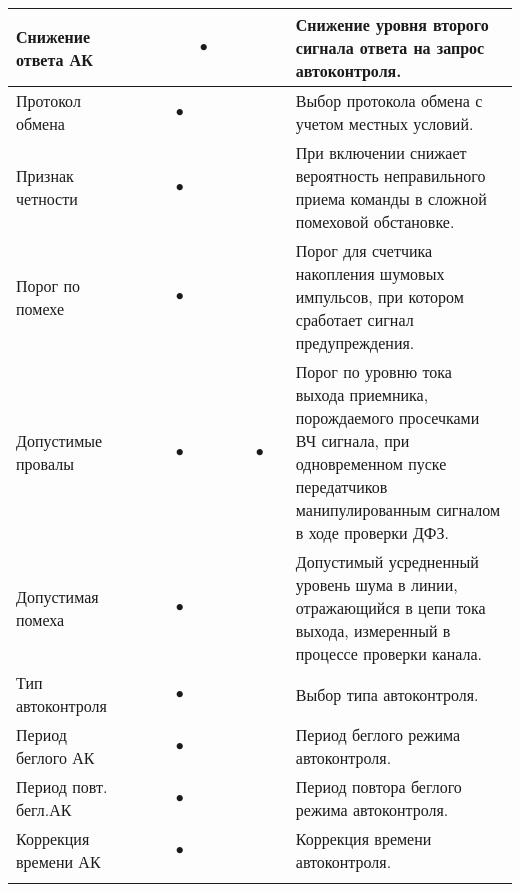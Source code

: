 \begin{tabularx}{\linewidth}{| M{4.6cm} |*{9}{p{0.3cm} |} m{5.8cm} |}
	Снижение ответа АК	&   &   &   &   & $\bullet$ &   &   &   &   & Снижение уровня второго сигнала ответа на запрос автоконтроля. \tabularnewline \hline
	Протокол обмена		&   &   &   & $\bullet$ &   &   &   &   &   & Выбор протокола обмена с учетом местных условий. \tabularnewline \hline
	Признак четности	&   &   &   & $\bullet$ &   &   &   &   &   & При включении снижает вероятность неправильного приема команды в сложной помеховой обстановке. \tabularnewline \hline
	Порог по помехе		&   &   &   & $\bullet$ &   &   &   &   &   & Порог для счетчика накопления шумовых импульсов, при котором сработает сигнал предупреждения. \tabularnewline \hline
	Допустимые провалы	&   &   &   & $\bullet$ &   &   &   & $\bullet$ &   & Порог по уровню тока выхода приемника, порождаемого просечками ВЧ сигнала, при одновременном пуске передатчиков манипулированным сигналом в ходе проверки ДФЗ. \tabularnewline \hline
	Допустимая помеха	&   &   &   & $\bullet$ &   &   &   &   &   & Допустимый усредненный уровень шума в линии, отражающийся в цепи тока выхода, измеренный в процессе проверки канала. \tabularnewline \hline
	Тип автоконтроля	&   &   &   & $\bullet$ &   &   &   &   &   & Выбор типа автоконтроля. \tabularnewline \hline
	Период беглого АК	&   &   &   & $\bullet$ &   &   &   &   &   & Период беглого режима автоконтроля. \tabularnewline \hline
	Период повт. бегл.АК &   &   &   & $\bullet$ &   &   &   &   &   & Период повтора беглого режима автоконтроля. \tabularnewline \hline
	Коррекция времени АК &   &   &   & $\bullet$ &   &   &   &   &   & Коррекция времени автоконтроля. \tabularnewline 
	
    \lasthline
\end{tabularx}